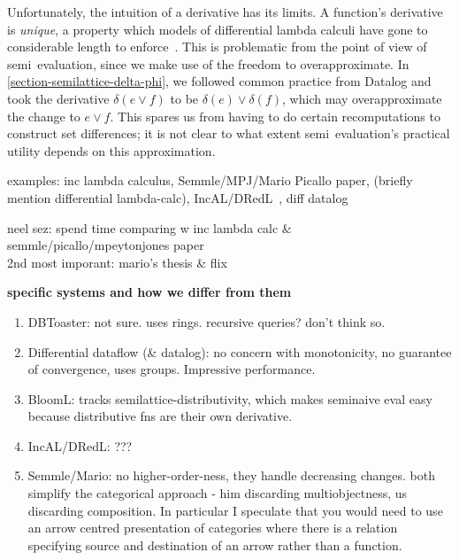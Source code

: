 Unfortunately, the intuition of a derivative has its limits. A function's
derivative is \emph{unique}, a property which models of differential lambda
calculi have gone to considerable length to
enforce~\citep{differential-categories}. This is problematic from the point of
view of semi\naive\ evaluation, since we make use of the freedom to
overapproximate.
%
In \cref{section-semilattice-delta-phi}, we followed common practice from
Datalog and took the derivative $\delta(e \vee f)$ to be $\delta(e) \vee
\delta(f)$, which may overapproximate the change to $e \vee f$.
%
This spares us from having to do certain recomputations to construct set
differences; it is not clear to what extent semi\naive\ evaluation's practical
utility depends on this approximation.

\vspace{10pt}
examples: inc lambda calculus, Semmle/MPJ/Mario Picallo paper, (briefly
mention differential lambda-calc), IncAL/DRedL~\citep{incal}, diff datalog~\citep{DBLP:conf/cidr/McSherryMII13}

neel sez: spend time comparing w inc lambda calc \& semmle/picallo/mpeytonjones paper\\
2nd most imporant: mario's thesis \& flix


\vspace{10pt}
\noindent
\textbf{specific systems and how we differ from them}\nopagebreak[4]
\begin{enumerate}[nosep]

\item DBToaster: not sure. uses rings. recursive queries? don't think so.

\item Differential dataflow (\& datalog): no concern with monotonicity, no
  guarantee of convergence, uses groups. Impressive performance.

\item BloomL: tracks semilattice-distributivity, which makes seminaive eval easy because distributive fns are their own derivative.

\item IncAL/DRedL: ???

\item Semmle/Mario: no higher-order-ness, they handle decreasing changes. both simplify the categorical approach - him discarding multiobjectness, us discarding composition. In particular I speculate that you would need to use an arrow centred presentation of categories where there is a relation specifying source and destination of an arrow rather than a function.
\end{enumerate}

